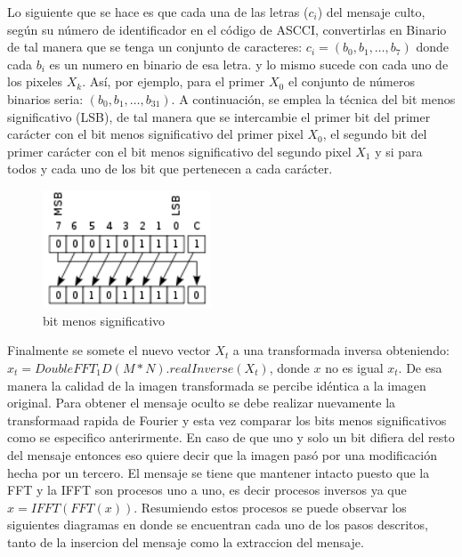 \documentclass[12pt]{article}
\begin{document}
\newline
Lo siguiente que se hace es que cada una de las letras ($c_i$) del mensaje culto, según su número de identificador en el código de ASCCI, convertirlas en Binario de tal manera que se tenga un conjunto de  caracteres: $c_i = (b_0, b_1,…,b_7)$ donde cada $b_i$ es un numero en binario de esa letra. y lo mismo sucede con cada uno de los pixeles $X_k$. Así, por ejemplo, para el primer $X_0$ el conjunto de números binarios seria: $(b_0, b_1,…,b_{31})$.
\newline
A continuación, se emplea la técnica del bit menos significativo (LSB), de tal manera que se intercambie el primer bit del primer carácter con el bit menos significativo del primer pixel $X_0$, el segundo bit del primer carácter con el bit menos significativo del segundo pixel $X_1$ y si para todos y cada uno de los bit que pertenecen a cada carácter.
\newline
\begin{figure}[hbtp]
\centering
\includegraphics[width = 5cm]{lsb.png}
\caption{bit menos significativo}
\end{figure}
\newline
Finalmente se somete el nuevo vector $X_t$ a una transformada inversa obteniendo:
$x_t = DoubleFFT_1D(M*N).realInverse(X_t)$, donde $x$ no es igual $x_t$. De esa manera la calidad de la imagen transformada se percibe idéntica a la imagen original.
\newline
Para obtener el mensaje oculto se debe realizar nuevamente la transformaad rapida de Fourier y esta vez comparar los bits menos significativos como se especifico anterirmente. En caso de que uno y solo un bit difiera del resto del mensaje entonces eso quiere decir que la imagen pasó por una modificación hecha por un tercero. El mensaje se tiene que mantener intacto puesto que la FFT y la IFFT son procesos uno a uno, es decir procesos inversos ya que $x = IFFT(FFT(x))$.
\newline
Resumiendo estos procesos se puede observar los siguientes diagramas en donde se encuentran cada uno de los pasos descritos, tanto de la insercion del mensaje como la extraccion del mensaje.
\newline
\end{document}
